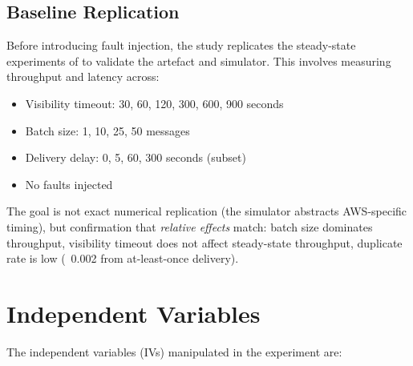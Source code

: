 \subsection{Baseline Replication}

Before introducing fault injection, the study replicates the steady-state experiments of \citet{Kyrychenko2025} to validate the artefact and simulator. This involves measuring throughput and latency across:
\begin{itemize}
    \item Visibility timeout: 30, 60, 120, 300, 600, 900 seconds
    \item Batch size: 1, 10, 25, 50 messages
    \item Delivery delay: 0, 5, 60, 300 seconds (subset)
    \item No faults injected
\end{itemize}

The goal is not exact numerical replication (the simulator abstracts AWS-specific timing), but confirmation that \emph{relative effects} match: batch size dominates throughput, visibility timeout does not affect steady-state throughput, duplicate rate is low (~0.002 from at-least-once delivery).

\section{Independent Variables}

The independent variables (IVs) manipulated in the experiment are:

